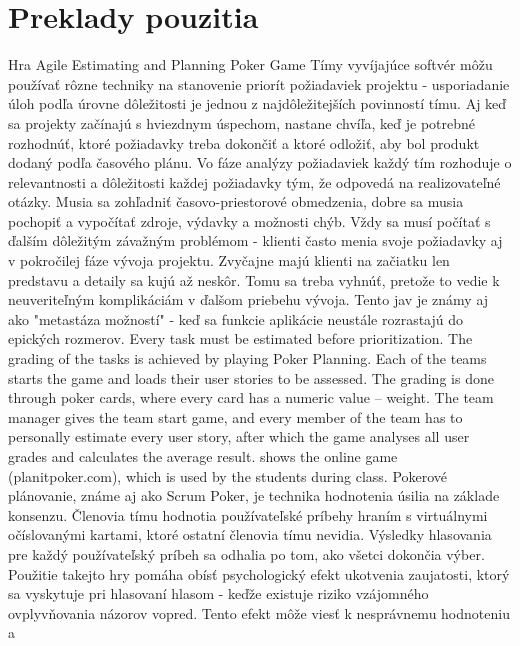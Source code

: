 \documentclass[14pt,a4paper]{article}
\begin{document}
\section{Preklady pouzitia}
Hra Agile Estimating and Planning Poker Game
\space
Tímy vyvíjajúce softvér môžu používať rôzne techniky na stanovenie priorít 
požiadaviek projektu - usporiadanie úloh podľa úrovne dôležitosti 
je jednou z najdôležitejších povinností tímu. 
Aj keď sa projekty začínajú s hviezdnym úspechom, nastane chvíľa, 
keď je potrebné rozhodnúť, ktoré požiadavky treba dokončiť a ktoré odložiť, 
aby bol produkt dodaný podľa časového plánu.
Vo fáze analýzy požiadaviek každý tím rozhoduje o relevantnosti a dôležitosti 
každej požiadavky tým, že odpovedá na realizovateľné otázky. 
Musia sa zohľadniť časovo-priestorové obmedzenia, 
dobre sa musia pochopiť a vypočítať zdroje, výdavky a možnosti chýb. 
Vždy sa musí počítať s ďalším dôležitým závažným problémom - klienti 
často menia svoje požiadavky aj v pokročilej fáze vývoja projektu. 
Zvyčajne majú klienti na začiatku len predstavu a detaily sa kujú až neskôr. 
Tomu sa treba vyhnúť, pretože to vedie k neuveriteľným komplikáciám v ďalšom 
priebehu vývoja. Tento jav je známy aj ako "metastáza možností" - keď sa 
funkcie aplikácie neustále rozrastajú do epických rozmerov.
Every task must be estimated before prioritization. 
The grading of the tasks is achieved by playing Poker Planning. 
Each of the teams starts the game and loads their user stories to be assessed. 
The grading is done through poker cards, where every card has a numeric value – weight.
The team manager gives the team start game, and every member of the team has 
to personally estimate every user story, after which the game analyses all 
user grades and calculates the average result. 
shows the online game (planitpoker.com), 
which is used by the students during class.
Pokerové plánovanie, známe aj ako Scrum Poker, je technika hodnotenia 
úsilia na základe konsenzu. 
Členovia tímu hodnotia používateľské príbehy hraním s 
virtuálnymi očíslovanými kartami, ktoré ostatní členovia tímu nevidia. 
Výsledky hlasovania pre každý používateľský príbeh sa odhalia po tom, 
ako všetci dokončia výber. Použitie takejto hry pomáha obísť 
psychologický efekt ukotvenia zaujatosti, ktorý sa vyskytuje pri 
hlasovaní hlasom - keďže existuje riziko vzájomného ovplyvňovania 
názorov vopred. Tento efekt môže viesť k nesprávnemu hodnoteniu a 
\end{document}
